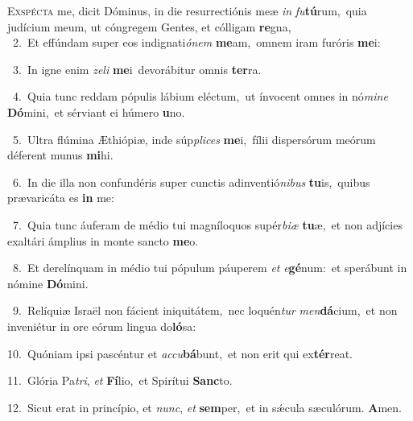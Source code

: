 \lettrine{\initial\textcolor{\initialcolor}{E}}{xspécta} me, dicit Dóminus, in die resurrectiónis meæ \textit{in} \textit{fu}\-\textbf{tú}rum,~\star quia judícium meum, ut cóngregem Gentes, et cólligam \textbf{re}\-gna,\\
{\numbfont\textcolor{\numbcolor}{~2.}}~Et effúndam super eos indignati\-\textit{ó}\-\textit{nem} \textbf{me}\-am,~\star omnem iram furóris \textbf{me}\-i:\par
{\numbfont\textcolor{\numbcolor}{~3.}}~In igne enim \textit{ze}\-\textit{li} \textbf{me}\-i~\star devorábitur omnis \textbf{ter}\-ra.\par
{\numbfont\textcolor{\numbcolor}{~4.}}~Quia tunc reddam pópulis lábium eléctum,~\dagger ut ínvocent omnes in nó\-\textit{mi}\-\textit{ne} \textbf{Dó}\-mini,~\star et sérviant ei húmero \textbf{u}\-no.\par
{\numbfont\textcolor{\numbcolor}{~5.}}~Ultra flúmina Æthiópiæ, inde súp\-\textit{pli}\-\textit{ces} \textbf{me}\-i,~\star fílii dispersórum meórum déferent munus \textbf{mi}\-hi.\par
{\numbfont\textcolor{\numbcolor}{~6.}}~In die illa non confundéris super cunctis adinventió\-\textit{ni}\-\textit{bus} \textbf{tu}\-is,~\star quibus prævaricáta es \textbf{in} me:\par
{\numbfont\textcolor{\numbcolor}{~7.}}~Quia tunc áuferam de médio tui magníloquos supér\-\textit{bi}\-\textit{æ} \textbf{tu}\-æ,~\star et non adjícies exaltári ámplius in monte sancto \textbf{me}\-o.\par
{\numbfont\textcolor{\numbcolor}{~8.}}~Et derelínquam in médio tui pópulum páuperem \textit{et} \textit{e}\-\textbf{gé}num:~\star et sperábunt in nómine \textbf{Dó}\-mini.\par
{\numbfont\textcolor{\numbcolor}{~9.}}~Relíquiæ Israël non fácient iniquitátem,~\dagger nec loquén\textit{tur} \textit{men}\-\textbf{dá}cium,~\star et non inveniétur in ore eórum lingua do\-\textbf{ló}\-sa:\par
{\numbfont\textcolor{\numbcolor}{10.}}~Quóniam ipsi pascéntur et \textit{ac}\-\textit{cu}\textbf{bá}bunt,~\star et non erit qui ex\-\textbf{tér}\-reat.\par
{\numbfont\textcolor{\numbcolor}{11.}}~Glória Pa\-\textit{tri}\-, \textit{et} \textbf{Fí}\-lio,~\star et Spirítui \textbf{Sanc}\-to.\par
{\numbfont\textcolor{\numbcolor}{12.}}~Sicut erat in princípio, et \textit{nunc}\-, \textit{et} \textbf{sem}\-per,~\star et in sǽcula sæculórum. \textbf{A}\-men.\par
